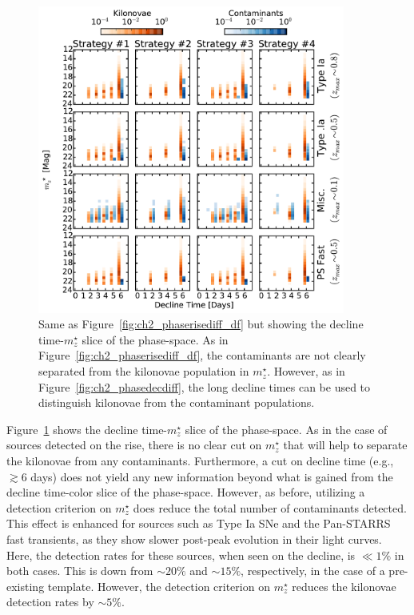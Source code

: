 \begin{figure}[t!]
\centering
\includegraphics[width=0.9\textwidth]{./figs/chapter2/ch2_f17.pdf}
\caption{Same as Figure~\ref{fig:ch2_phaserisediff_df} but showing the decline time-$m^{\star}_z$ slice of the phase-space. As in Figure~\ref{fig:ch2_phaserisediff_df}, the contaminants are not clearly separated from the kilonovae population in $m^{\star}_z$. However, as in Figure~\ref{fig:ch2_phasedecdiff}, the long decline times can be used to distinguish kilonovae from the contaminant populations.}
\label{fig:ch2_phasedecdiff_df}
\end{figure}

Figure~\ref{fig:ch2_phasedecdiff_df} shows the decline time-$m^{\star}_z$ slice of the phase-space. As in the case of sources detected on the rise, there is no clear cut on $m^{\star}_z$ that will help to separate the kilonovae from any contaminants. Furthermore, a cut on decline time (e.g., $\gtrsim 6$ days) does not yield any new information beyond what is gained from the decline time-color slice of the phase-space. However, as before, utilizing a detection criterion on $m^{\star}_z$ does reduce the total number of contaminants detected. This effect is enhanced for sources such as Type Ia SNe and the Pan-STARRS fast transients, as they show slower post-peak evolution in their light curves. Here, the detection rates for these sources, when seen on the decline, is $\ll1\%$ in both cases. This is down from $\sim20\%$ and $\sim15\%$, respectively, in the case of a pre-existing template. However, the detection criterion on $m^{\star}_z$ reduces the kilonovae detection rates by $\sim5\%$.

